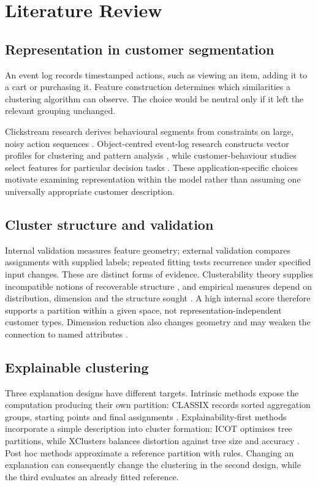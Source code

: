 \chapter{Literature Review}

\section{Representation in customer segmentation}

An event log records timestamped actions, such as viewing an item, adding it to a cart or purchasing it. Feature construction determines which similarities a clustering algorithm can observe. The choice would be neutral only if it left the relevant grouping unchanged.

Clickstream research derives behavioural segments from constraints on large, noisy action sequences \citep{dextras2019segmentifier}. Object-centred event-log research constructs vector profiles for clustering and pattern analysis \citep{faria2023eventlogs}, while customer-behaviour studies select features for particular decision tasks \citep{abdi2019cbmf}. These application-specific choices motivate examining representation within the model rather than assuming one universally appropriate customer description.

\section{Cluster structure and validation}

Internal validation measures feature geometry; external validation compares assignments with supplied labels; repeated fitting tests recurrence under specified input changes. These are distinct forms of evidence. Clusterability theory supplies incompatible notions of recoverable structure \citep{ackerman2009clusterability}, and empirical measures depend on distribution, dimension and the structure sought \citep{adolfsson2019clusterability}. A high internal score therefore supports a partition within a given space, not representation-independent customer types. Dimension reduction also changes geometry and may weaken the connection to named attributes \citep{bertsimas2021icot}.

\section{Explainable clustering}

Three explanation designs have different targets. Intrinsic methods expose the computation producing their own partition: CLASSIX records sorted aggregation groups, starting points and final assignments \citep{chen2024classix}. Explainability-first methods incorporate a simple description into cluster formation: ICOT optimises tree partitions, while XClusters balances distortion against tree size and accuracy \citep{bertsimas2021icot,hwang2023xclusters}. Post hoc methods approximate a reference partition with rules. Changing an explanation can consequently change the clustering in the second design, while the third evaluates an already fitted reference.

